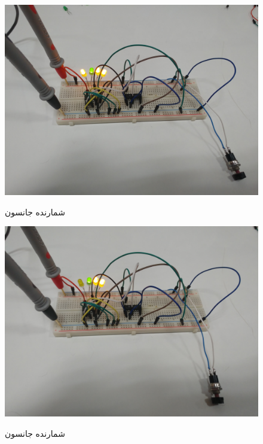 \documentclass[twoside]{article}
\begin{document}
	\begin{figure}[h!]
		\begin{center}
			\includegraphics[scale=0.05]{j5}‎
			\caption{شمارنده جانسون}
		\end{center}
	\end{figure} 
	
	\begin{figure}[h!]
		\begin{center}
			\includegraphics[scale=0.05]{j6}‎
			\caption{شمارنده جانسون}
		\end{center}
	\end{figure} 
	
\end{document}
